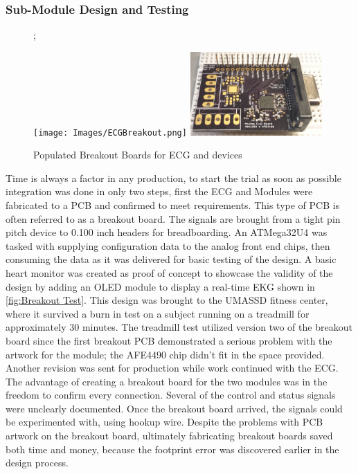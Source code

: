 \subsubsection {Sub-Module Design and Testing}

\begin{figure};
	\begin{center}
		\label{fig:Breakouts}
		\texttt{[image: Images/ECGBreakout.png]} 
		\includegraphics[scale=1,width=0.45\textwidth]{Images/SPO2Breakout.png} 		
		\caption{Populated Breakout Boards for ECG and  devices}
	\end{center}
\end{figure}

Time is always a factor in any production, to start the trial as soon as possible integration was done in only two steps, first the ECG and  Modules were fabricated to a PCB and confirmed to meet requirements. This type of PCB is often referred to as a breakout board. The signals are brought from a tight pin pitch device to 0.100 inch headers for breadboarding. An ATMega32U4 \cite{ATMEGA32U4} was tasked with supplying configuration data to the analog front end chips, then consuming the data as it was delivered for basic testing of the design. A basic heart monitor was created as proof of concept to showcase the validity of the design by adding an OLED module to display a real-time EKG shown in \cref{fig:Breakout Test}. This design was brought to the UMASSD fitness center, where it survived a burn in test on a subject running on a treadmill for approximately 30 minutes. 
The treadmill test utilized version two of the breakout board since the first breakout PCB demonstrated a serious problem with the artwork for the  module; the AFE4490 chip didn't fit in the space provided. Another revision was sent for production while work continued with the ECG. The advantage of creating a breakout board for the two modules was in the freedom to confirm every connection. Several of the control and status signals were unclearly documented. Once the breakout board arrived, the signals could be experimented with, using hookup wire. Despite the problems with PCB artwork on the breakout board, ultimately fabricating breakout boards saved both time and money, because the footprint error was discovered earlier in the design process.


